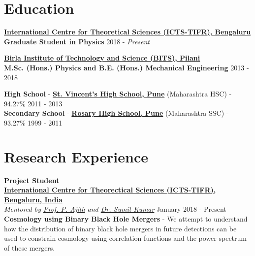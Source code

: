 \documentclass[margin, centered]{res}
\begin{document}
\begin{resume}


\section{Education}
\textbf{\href{https://www.icts.res.in/}{International Centre for Theoretical Sciences (ICTS-TIFR), Bengaluru}}\\
\textbf{Graduate Student in Physics} \hfill 2018 - \textit{Present}

\textbf{\href{http://www.bits-pilani.ac.in/}{Birla Institute of Technology and Science (BITS), Pilani}}\\
\textbf{M.Sc. (Hons.) Physics and B.E. (Hons.) Mechanical Engineering} \hfill 2013 - 2018

\textbf{High School} - \textbf{\href{http://www.stvincentspune.com/}{St. Vincent's High School, Pune}} (Maharashtra HSC) - 94.27\% \hfill 2011 - 2013 \\
\textbf{Secondary School} - \textbf{\href{http://www.rosaryedu.org}{Rosary High School, Pune}} (Maharashtra SSC) - 93.27\% \hfill 1999 - 2011

\section{Research Experience}
\textbf{Project Student}
\\
\textbf{\href{https://icts.res.in/}{International Centre for Theorectical Sciences (ICTS-TIFR), Bengaluru, India}}\\
\emph{Mentored by \href{https://home.icts.res.in/~ajith/Home.html}{Prof. P. Ajith} and \href{https://www.icts.res.in/people/sumit-kumar}{Dr. Sumit Kumar}} \hfill January 2018 - Present\\
\textbf{Cosmology using Binary Black Hole Mergers} - We attempt to understand how the distribution of binary black hole mergers in future detections can be used to constrain cosmology using correlation functions and the power spectrum of these mergers.


\end{resume}
\end{document}
